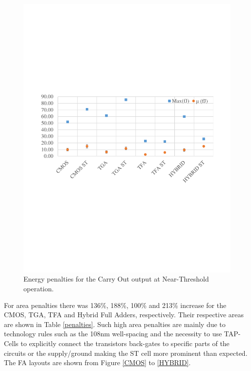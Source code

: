 \documentclass[ecp,tc, english]{iiufrgs}
\begin{document}
\begin{figure}[H]
\centering
\includegraphics[width=\textwidth, trim={0 9cm 0 9cm},clip]{energyNTCarryOut.pdf}
\caption{Energy penalties for the Carry Out output at Near-Threshold operation.}
\label{fig:energyNTCO}
\end{figure}

For area penalties there was 136\%, 188\%, 100\% and 213\% increase for the CMOS, TGA, TFA and Hybrid Full Adders, respectively. Their respective areas are shown in Table \ref{penalties}. Such high area penalties are mainly due to technology rules such as the 108nm well-spacing and the necessity to use TAP-Cells to explicitly connect the transistors back-gates to specific parts of the circuits or the supply/ground making the ST cell more prominent than expected. The FA layouts are shown from Figure \ref{CMOS} to \ref{HYBRID}.
\end{document}
